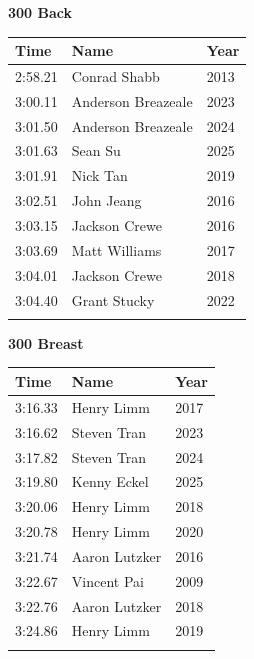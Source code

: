 \vspace{1.2em}
\noindent\begin{minipage}[t]{0.48\textwidth}
\centering
\textbf{\textcolor{teamprimary}{300 Back}}\par
\vspace{0.5em}
\centering
\small
\renewcommand{\arraystretch}{1.0}
\setlength{\tabcolsep}{4pt}
\begin{tabular}{@{}p{1.8cm}p{3.0cm}p{1.0cm}@{}}
\toprule
\textbf{Time} & \textbf{Name} & \textbf{Year} \\
\midrule
2:58.21 & Conrad Shabb & 2013 \\
3:00.11 & Anderson Breazeale & 2023 \\
3:01.50 & Anderson Breazeale & 2024 \\
3:01.63 & Sean Su & 2025 \\
3:01.91 & Nick Tan & 2019 \\
3:02.51 & John Jeang & 2016 \\
3:03.15 & Jackson Crewe & 2016 \\
3:03.69 & Matt Williams & 2017 \\
3:04.01 & Jackson Crewe & 2018 \\
3:04.40 & Grant Stucky & 2022 \\
\bottomrule
\vspace{0.5em}
\end{tabular}
\end{minipage}
\hfill
\begin{minipage}[t]{0.48\textwidth}
\centering
\textbf{\textcolor{teamprimary}{300 Breast}}\par
\vspace{0.5em}
\centering
\small
\renewcommand{\arraystretch}{1.0}
\setlength{\tabcolsep}{4pt}
\begin{tabular}{@{}p{1.8cm}p{3.0cm}p{1.0cm}@{}}
\toprule
\textbf{Time} & \textbf{Name} & \textbf{Year} \\
\midrule
3:16.33 & Henry Limm & 2017 \\
3:16.62 & Steven Tran & 2023 \\
3:17.82 & Steven Tran & 2024 \\
3:19.80 & Kenny Eckel & 2025 \\
3:20.06 & Henry Limm & 2018 \\
3:20.78 & Henry Limm & 2020 \\
3:21.74 & Aaron Lutzker & 2016 \\
3:22.67 & Vincent Pai & 2009 \\
3:22.76 & Aaron Lutzker & 2018 \\
3:24.86 & Henry Limm & 2019 \\
\bottomrule
\vspace{0.5em}
\end{tabular}
\end{minipage}
